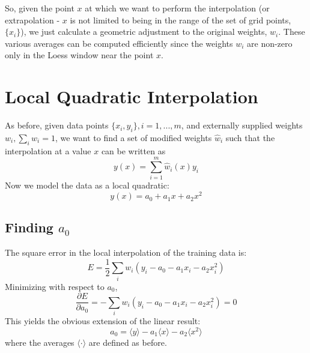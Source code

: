 \documentclass[oneside]{tufte-handout}
\begin{document}
\begin{fullwidth}
So, given the point $x$ at which we want to perform the interpolation (or extrapolation - $x$ is not limited to being in the range of the set of grid points, $\{x_i\}$), we just calculate a geometric adjustment to the original weights, $w_i$. These various averages can be computed efficiently since the weights $w_i$ are non-zero only in the Loess window near the point $x$.

\section{Local Quadratic Interpolation}
As before, given data points $\{x_i, y_i\}, i = 1, ..., m$, and externally supplied weights $w_i, \sum_i w_i = 1$, we want to find a set of modified weights $\hat{w}_i$ such that the interpolation at a value $x$ can be written as
\begin{equation}
y(x) = \sum_{i=1}^m \hat{w}_i(x) y_i
\end{equation}
Now we model the data as a local quadratic:
\begin{equation}\label{eq:quadratic}
y(x) = a_0 + a_1 x + a_2 x^2
\end{equation}

\subsection{Finding $a_0$}
The square error in the local interpolation of the training data is:
\begin{equation}\label{eq:quad-error}
E = \frac{1}{2} \sum_i w_i (y_i - a_0 - a_1 x_i - a_2 x_i^2)
\end{equation}
Minimizing with respect to $a_0$,
\begin{equation}
\frac{\partial E}{\partial a_0} = - \sum_i w_i (y_i - a_0 - a_1 x_i - a_2 x_i^2) = 0
\end{equation}
This yields the obvious extension of the linear result:
\begin{equation}\label{eq:a0}
a_0 = \langle y \rangle - a_1 \langle x \rangle - a_2 \langle x^2 \rangle
\end{equation}
where the averages $\langle \cdot \rangle$ are defined as before.


\end{fullwidth}
\end{document}

